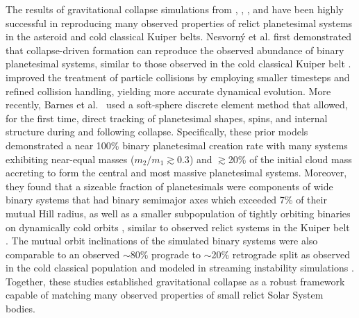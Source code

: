 \documentclass[fleqn,usenatbib]{mnras}
\begin{document}
The results of gravitational collapse simulations from \citet{Nesvorny2010}, \citet{Robinson2020}, \citet{Nesvorny2021}, and \citet{Barnes2025} have been highly successful in reproducing many observed properties of relict planetesimal systems in the asteroid and cold classical Kuiper belts.
Nesvorn\'y et al. \citep{Nesvorny2010} first demonstrated that collapse-driven formation can reproduce the observed abundance of binary planetesimal systems, similar to those observed in the cold classical Kuiper belt \citep[e.g.,][]{Fraser2017,Grundy2019,Noll2020}.
\citet{Robinson2020} improved the treatment of particle collisions by employing smaller timesteps and refined collision handling, yielding more accurate dynamical evolution.
More recently, Barnes et al.~\citep{Barnes2025} used a soft-sphere discrete element method \citep[SSDEM;][]{Schwartz2012,Zhang2017} that allowed, for the first time, direct tracking of planetesimal shapes, spins, and internal structure during and following collapse.
Specifically, these prior models demonstrated a near 100\% binary planetesimal creation rate with many systems exhibiting near-equal masses ($m_2/m_1\gtrsim0.3$) and $\gtrsim$20\% of the initial cloud mass accreting to form the central and most massive planetesimal systems.
Moreover, they found that a sizeable fraction of planetesimals were components of wide binary systems that had binary semimajor axes which exceeded 7\% of their mutual Hill radius, as well as a smaller subpopulation of tightly orbiting binaries on dynamically cold orbits \citep{Robinson2020,Barnes2025}, similar to observed relict systems in the Kuiper belt \citep{Grundy2019,Noll2020}.
The mutual orbit inclinations of the simulated binary systems were also comparable to an observed $\sim$80\% prograde to $\sim$20\% retrograde split \citep{Barnes2025} as observed in the cold classical population \citep{Grundy2019} and modeled in streaming instability simulations \citep{Nesvorny2019}.
Together, these studies established gravitational collapse as a robust framework capable of matching many observed properties of small relict Solar System bodies.
\end{document}

